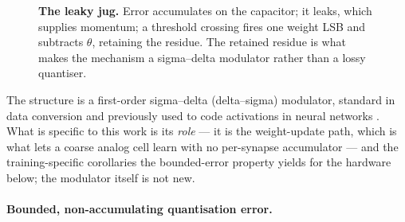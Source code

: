 \documentclass[11pt]{article}
\begin{document}
\begin{figure}[t]
\centering
{}
\caption{\textbf{The leaky jug.} Error accumulates on the capacitor; it leaks, which supplies
momentum; a threshold crossing fires one weight LSB and subtracts $\theta$, retaining the residue.
The retained residue is what makes the mechanism a sigma--delta modulator rather than a lossy
quantiser.}
\label{fig:jug}
\end{figure}

The structure is a first-order sigma--delta (delta--sigma) modulator,
standard in data conversion and previously used to code activations in
neural networks \cite{oconnor2017sigma}. What is specific to this work
is its \emph{role} --- it is the weight-update path, which is what lets
a coarse analog cell learn with no per-synapse accumulator --- and the
training-specific corollaries the bounded-error property yields for the
hardware below; the modulator itself is not new.

\hypertarget{bounded-non-accumulating-quantisation-error.}{%
\paragraph{Bounded, non-accumulating quantisation
error.}\label{bounded-non-accumulating-quantisation-error.}}
\end{document}

